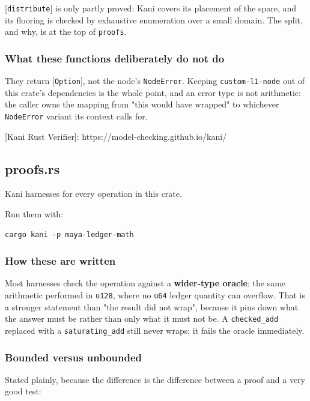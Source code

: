 \documentclass[11pt,a4paper]{article}
\begin{document}
[\texttt{distribute}] is only partly proved: Kani covers its placement of the
spare, and its flooring is checked by exhaustive enumeration over a small
domain. The split, and why, is at the top of \texttt{proofs}.

\subsubsection{What these functions deliberately do not do}

They return [\texttt{Option}], not the node's \texttt{NodeError}. Keeping \texttt{custom-l1-node}
out of this crate's dependencies is the whole point, and an error type is
not arithmetic: the caller owns the mapping from "this would have wrapped"
to whichever \texttt{NodeError} variant its context calls for.

[Kani Rust Verifier]: https://model-checking.github.io/kani/

\subsection{proofs.rs}
Kani harnesses for every operation in this crate.

Run them with:

\begin{verbatim}
cargo kani -p maya-ledger-math
\end{verbatim}

\subsubsection{How these are written}

Most harnesses check the operation against a \textbf{wider-type oracle}: the same
arithmetic performed in \texttt{u128}, where no \texttt{u64} ledger quantity can overflow.
That is a stronger statement than "the result did not wrap", because it pins
down what the answer must be rather than only what it must not be. A
\texttt{checked\_add} replaced with a \texttt{saturating\_add} still never wraps; it fails
the oracle immediately.

\subsubsection{Bounded versus unbounded}

Stated plainly, because the difference is the difference between a proof and
a very good test:
\end{document}

